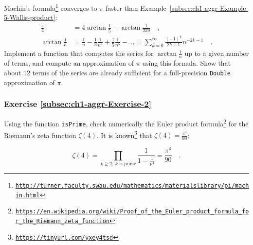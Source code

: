 Machin\textsf{'}s formula\footnote{\texttt{\href{http://turner.faculty.swau.edu/mathematics/materialslibrary/pi/machin.html}{http://turner.faculty.swau.edu/mathematics/materialslibrary/pi/machin.html}}}
converges to $\pi$ faster than Example~\ref{subsec:ch1-aggr-Example-5-Wallis-product}:
\begin{align*}
\frac{\pi}{4} & =4\arctan\frac{1}{5}-\arctan\frac{1}{239}\quad,\\
\arctan\frac{1}{n} & =\frac{1}{n}-\frac{1}{3}\frac{1}{n^{3}}+\frac{1}{5}\frac{1}{n^{5}}-...=\sum_{k=0}^{\infty}\frac{\left(-1\right)^{k}}{2k+1}n^{-2k-1}\quad.
\end{align*}
Implement a function that computes the series for $\arctan\frac{1}{n}$
up to a given number of terms, and compute an approximation of $\pi$
using this formula. Show that about $12$ terms of the series are
already sufficient for a full-precision \lstinline!Double! approximation
of $\pi$.%
\begin{comment}
def at(n: Double, maxN: Int) = (0 to maxN).map(k => 1.0{*}(1 - k \%
2 {*} 2) / (2{*}k+1) / math.pow(n, 2{*}k+1) ).sum ; def p(n: Int)
= 16{*}at(5, n) - 4{*}at(239, n); p(12)
\end{comment}


\subsubsection{Exercise \label{subsec:ch1-aggr-Exercise-2}\ref{subsec:ch1-aggr-Exercise-2}}

Using the function \lstinline!isPrime!, check numerically the Euler
product formula\footnote{\texttt{\href{https://en.wikipedia.org/wiki/Proof_of_the_Euler_product_formula_for_the_Riemann_zeta_function}{https://en.wikipedia.org/wiki/Proof\_of\_the\_Euler\_product\_formula\_for\_the\_Riemann\_zeta\_function}}}
for the Riemann\textsf{'}s zeta function $\zeta\left(4\right)$.
It is known\footnote{\texttt{\href{https://ocw.mit.edu/courses/mathematics/18-104-seminar-in-analysis-applications-to-number-theory-fall-2006/projects/chan.pdf}{https://tinyurl.com/yxey4tsd}}}
that $\zeta\left(4\right)=\frac{\pi^{4}}{90}$:%
\begin{comment}
Code: def isPrime(n: Int) = (2 to n-1).takeWhile(k => k{*}k <= n).forall(k
=> n \% k != 0); def ep(n: Int): Double = (2 to n).filter(isPrime).map(k
=> 1.0 / (1.0 - 1.0 / k/k/k/k)).product; ep(100); pi{*}pi{*}pi{*}pi/90;
\end{comment}
\[
\zeta\left(4\right)=\prod_{k\geq2;~k\text{ is prime}}\frac{1}{1-\frac{1}{p^{4}}}=\frac{\pi^{4}}{90}\quad.
\]


